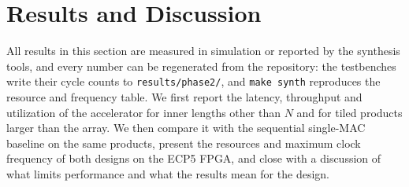 
\section{Results and Discussion}
All results in this section are measured in simulation or reported by the synthesis tools, and every number can be regenerated from the repository: the testbenches write their cycle counts to \texttt{results/phase2/}, and \texttt{make synth} reproduces the resource and frequency table. We first report the latency, throughput and utilization of the accelerator for inner lengths other than $N$ and for tiled products larger than the array. We then compare it with the sequential single-MAC baseline on the same products, present the resources and maximum clock frequency of both designs on the ECP5 FPGA, and close with a discussion of what limits performance and what the results mean for the design.
